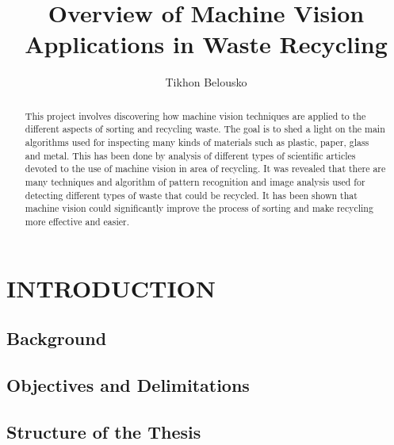 \documentclass{lutmscthesis}[2010/09/22]
\title{Overview of Machine Vision Applications in Waste Recycling}
\author{Tikhon Belousko}
\begin{document}


\maketitle
\newpage


\begin{abstract}

This project involves discovering how machine vision techniques are applied
to the different aspects of sorting and recycling waste. The goal is to shed
a light on the main algorithms used for inspecting many kinds of materials such
as plastic, paper, glass and metal. This has been done by analysis of different
types of scientific articles devoted to the use of machine vision in area of
recycling. It was revealed that there are many techniques and algorithm of
pattern recognition and image analysis used for detecting different types
of waste that could be recycled. It has been shown that machine vision
could significantly improve the process of sorting and make recycling
more effective and easier.

\end{abstract}


\renewcommand\refname{REFERENCES}
\renewcommand\contentsname{CONTENTS}
\newpage

\tableofcontents

\section{ INTRODUCTION }
\setlength{\parskip}{3ex}

\subsection{ Background }
\subsection{ Objectives and Delimitations }
\subsection{ Structure of the Thesis }
\end{document}
